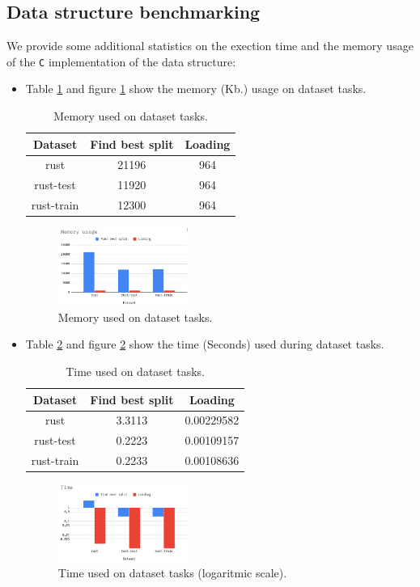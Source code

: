 \documentclass{acm_proc_article-sp}
\begin{document}
\subsection{Data structure benchmarking}
We provide some additional statistics on the exection time and the memory usage of the \texttt{C} implementation of the data structure:
\begin {itemize}
  \item Table \ref{table:5} and figure \ref{fig:memoryusage} show the memory (Kb.) usage on dataset tasks.
  \begin{table}[h]
    \centering
    \begin{tabular}{|c|c|c|}
      \hline
      Dataset & Find best split & Loading \\ \hline
      rust       & 21196 & 964 \\
      rust-test  & 11920 & 964 \\
      rust-train & 12300 & 964 \\ \hline
    \end{tabular}
    \caption{Memory used on dataset tasks.}
    \label{table:5}
  \end{table}
  \begin{figure}[h]
    \centering
    \includegraphics[width=0.4\textwidth]{memoryusage}
    \caption{Memory used on dataset tasks.}
    \label{fig:memoryusage}
  \end{figure}
  \item Table \ref{table:6} and figure \ref{fig:time} show the time (Seconds) used during dataset tasks.
  \begin{table}[h]
    \centering
    \begin{tabular}{|c|c|c|}
      \hline
      Dataset & Find best split & Loading \\ \hline
      rust       & 3.3113 & 0.00229582 \\
      rust-test  & 0.2223 & 0.00109157 \\
      rust-train & 0.2233 & 0.00108636\\ \hline
    \end{tabular}
    \caption{Time used on dataset tasks.}
    \label{table:6}
  \end{table}
  \begin{figure}[h]
    \centering
    \includegraphics[width=0.4\textwidth]{time}
    \caption{Time used on dataset tasks (logaritmic scale).}
    \label{fig:time}
  \end{figure}
\end{itemize}
\end{document}

